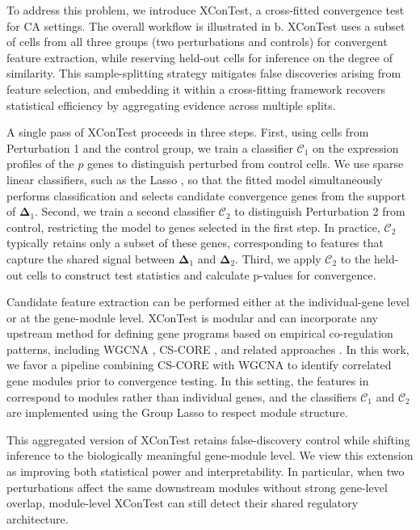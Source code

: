 \documentclass[11pt]{article}
\begin{document}
To address this problem, we introduce XConTest, a cross-fitted convergence test for CA settings. The overall workflow is illustrated in b. XConTest uses a subset of cells from all three groups (two perturbations and controls) for convergent feature extraction, while reserving held-out cells for inference on the degree of similarity. This sample-splitting strategy mitigates false discoveries arising from feature selection, and embedding it within a cross-fitting framework recovers statistical efficiency by aggregating evidence across multiple splits.

A single pass of XConTest proceeds in three steps. First, using cells from Perturbation 1 and the control group, we train a classifier $\mathcal{C}_1$ on the expression profiles of the $p$ genes to distinguish perturbed from control cells. We use sparse linear classifiers, such as the Lasso \citep{tibshirani1996regression}, so that the fitted model simultaneously performs classification and selects candidate convergence genes from the support of $\bm{\Delta}_1$. Second, we train a second classifier $\mathcal{C}_2$ to distinguish Perturbation 2 from control, restricting the model to genes selected in the first step. In practice, $\mathcal{C}_2$ typically retains only a subset of these genes, corresponding to features that capture the shared signal between $\bm{\Delta}_1$ and $\bm{\Delta}_2$. Third, we apply $\mathcal{C}_2$ to the held-out cells to construct test statistics and calculate p-values for convergence.

Candidate feature extraction can be performed either at the individual-gene level or at the gene-module level. XConTest is modular and can incorporate any upstream method for defining gene programs based on empirical co-regulation patterns, including WGCNA \citep{langfelder2008wgcna}, CS-CORE \citep{su2023cell}, and related approaches \citep{wang2021constructing,schnitzler2024convergence}. In this work, we favor a pipeline combining CS-CORE with WGCNA to identify correlated gene modules prior to convergence testing. In this setting, the features in  correspond to modules rather than individual genes, and the classifiers $\mathcal{C}_1$ and $\mathcal{C}_2$ are implemented using the Group Lasso \citep{meier2008group} to respect module structure.

This aggregated version of XConTest retains false-discovery control while shifting inference to the biologically meaningful gene-module level. We view this extension as improving both statistical power and interpretability. In particular, when two perturbations affect the same downstream modules without strong gene-level overlap, module-level XConTest can still detect their shared regulatory architecture.
\end{document}
